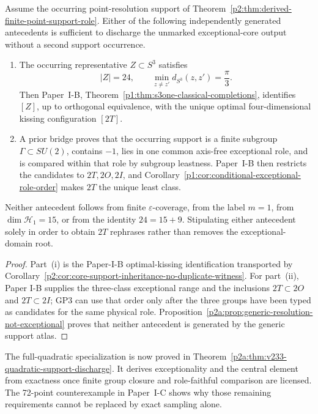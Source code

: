 \documentclass[11pt,a4paper]{article}
\begin{document}
\begin{corollary}
\label{p2a:cor:two-conditional-2t-discharge-routes}
Assume the occurring point-resolution support of
Theorem~\ref{p2:thm:derived-finite-point-support-role}.  Either of the
following independently generated antecedents is sufficient to discharge the
unmarked exceptional-core output without a second support occurrence.
\begin{enumerate}[label=(\roman*),leftmargin=2em]
\item The occurring representative \(Z\subset S^3\) satisfies
\[
 |Z|=24,
 \qquad
 \min_{z\ne z'}d_{S^3}(z,z')=\frac\pi3.
\]
Then Paper~I-B,
Theorem~\ref{p1:thm:s3one-classical-completions}, identifies \([Z]\), up to
orthogonal equivalence, with the unique optimal four-dimensional kissing
configuration \([2T]\).
\item A prior bridge proves that the occurring support is a finite subgroup
\(\Gamma\subset SU(2)\), contains \(-1\), lies in one common axis-free
exceptional role, and is compared within that role by subgroup leastness.
Paper~I-B then restricts the candidates to \(2T,2O,2I\), and
Corollary~\ref{p1:cor:conditional-exceptional-role-order} makes \(2T\) the
unique least class.
\end{enumerate}
Neither antecedent follows from finite \(\varepsilon\)-coverage, from the
label \(m=1\), from \(\dim\mathcal H_1=15\), or from the identity
\(24=15+9\).  Stipulating either antecedent solely in order to obtain \(2T\)
rephrases rather than removes the exceptional-domain root.
\end{corollary}

\begin{proof}
Part~(i) is the Paper-I-B optimal-kissing identification transported by
Corollary~\ref{p2:cor:core-support-inheritance-no-duplicate-witness}.
For part~(ii), Paper I-B supplies the three-class exceptional range and the
inclusions \(2T\subset2O\) and \(2T\subset2I\); GP3 can use that order only
after the three groups have been typed as candidates for the same physical
role.  Proposition~\ref{p2a:prop:generic-resolution-not-exceptional} proves
that neither antecedent is generated by the generic support atlas.
\end{proof}

The full-quadratic specialization is now proved in
Theorem~\ref{p2a:thm:v233-quadratic-support-discharge}. It derives
exceptionality and the central element from exactness once finite
group closure and role-faithful comparison are licensed. The
72-point counterexample in Paper~I-C shows why those remaining
requirements cannot be replaced by exact sampling alone.
\end{document}
